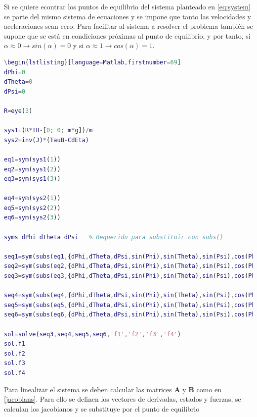 \documentclass[twoside,11pt]{report}
\begin{document}
Si se quiere econtrar los puntos de equilibrio del sistema planteado en \ref{eq:system} se parte del mismo sistema de ecuaciones y se impone que tanto las velocidades y aceleraciones sean cero. 
Para facilitar al sistema a resolver el problema también se supone que se está en condiciones próximas al punto de equilibrio, y por tanto, si  $\alpha \approx 0 \rightarrow sin(\alpha)=0$ y si $\alpha \approx 1 \rightarrow cos(\alpha)=1$.
\singlespacing
\begin{lstlisting}[language=Matlab,firstnumber=68]
\begin{lstlisting}[language=Matlab,firstnumber=69]
dPhi=0
dTheta=0
dPsi=0

R=eye(3)

sys1=(R*TB-[0; 0; m*g])/m
sys2=inv(J)*(TauB-CdEta)

eq1=sym(sys1(1))
eq2=sym(sys1(2))
eq3=sym(sys1(3))

eq4=sym(sys2(1))
eq5=sym(sys2(2))
eq6=sym(sys2(3))

syms dPhi dTheta dPsi 	% Requerido para substituir con subs()

seq1=sym(subs(eq1,{dPhi,dTheta,dPsi,sin(Phi),sin(Theta),sin(Psi),cos(Phi),cos(Theta),cos(Psi)},{0,0,0,0,0,0,1,1,1}))
seq2=sym(subs(eq2,{dPhi,dTheta,dPsi,sin(Phi),sin(Theta),sin(Psi),cos(Phi),cos(Theta),cos(Psi)},{0,0,0,0,0,0,1,1,1}))
seq3=sym(subs(eq3,{dPhi,dTheta,dPsi,sin(Phi),sin(Theta),sin(Psi),cos(Phi),cos(Theta),cos(Psi)},{0,0,0,0,0,0,1,1,1}))

seq4=sym(subs(eq4,{dPhi,dTheta,dPsi,sin(Phi),sin(Theta),sin(Psi),cos(Phi),cos(Theta),cos(Psi)},{0,0,0,0,0,0,1,1,1}))
seq5=sym(subs(eq5,{dPhi,dTheta,dPsi,sin(Phi),sin(Theta),sin(Psi),cos(Phi),cos(Theta),cos(Psi)},{0,0,0,0,0,0,1,1,1}))
seq6=sym(subs(eq6,{dPhi,dTheta,dPsi,sin(Phi),sin(Theta),sin(Psi),cos(Phi),cos(Theta),cos(Psi)},{0,0,0,0,0,0,1,1,1}))

sol=solve(seq3,seq4,seq5,seq6,'f1','f2','f3','f4')
sol.f1
sol.f2
sol.f3
sol.f4
\end{lstlisting}
\onehalfspacing

Para linealizar el sistema se deben calcular las matrices $\mathbf{A}$ y $\mathbf{B}$ como en  \ref{jacobians}. Para ello se definen los vectores de derivadas, estados y fuerzas, se calculan los jacobianos y se substituye por el punto de equilibrio
\end{document}
